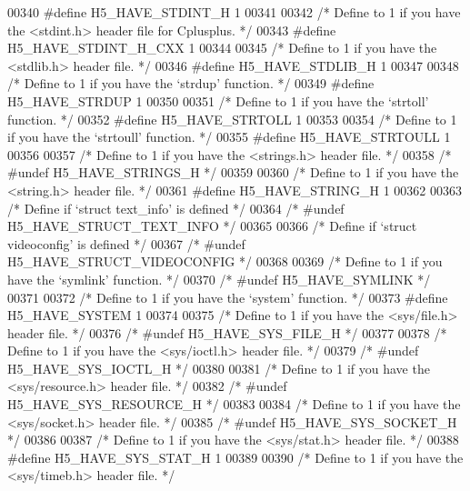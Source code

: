 \begin{DoxyCode}
{00340 \textcolor{preprocessor}{#define H5\_HAVE\_STDINT\_H 1}
00341 
00342 \textcolor{comment}{/* Define to 1 if you have the <stdint.h> header file for Cplusplus. */}
00343 \textcolor{preprocessor}{#define H5\_HAVE\_STDINT\_H\_CXX 1}
00344 
00345 \textcolor{comment}{/* Define to 1 if you have the <stdlib.h> header file. */}
00346 \textcolor{preprocessor}{#define H5\_HAVE\_STDLIB\_H 1}
00347 
00348 \textcolor{comment}{/* Define to 1 if you have the `strdup' function. */}
00349 \textcolor{preprocessor}{#define H5\_HAVE\_STRDUP 1}
00350 
00351 \textcolor{comment}{/* Define to 1 if you have the `strtoll' function. */}
00352 \textcolor{preprocessor}{#define H5\_HAVE\_STRTOLL 1}
00353 
00354 \textcolor{comment}{/* Define to 1 if you have the `strtoull' function. */}
00355 \textcolor{preprocessor}{#define H5\_HAVE\_STRTOULL 1}
00356 
00357 \textcolor{comment}{/* Define to 1 if you have the <strings.h> header file. */}
00358 \textcolor{comment}{/* #undef H5\_HAVE\_STRINGS\_H */}
00359 
00360 \textcolor{comment}{/* Define to 1 if you have the <string.h> header file. */}
00361 \textcolor{preprocessor}{#define H5\_HAVE\_STRING\_H 1}
00362 
00363 \textcolor{comment}{/* Define if `struct text\_info' is defined */}
00364 \textcolor{comment}{/* #undef H5\_HAVE\_STRUCT\_TEXT\_INFO */}
00365 
00366 \textcolor{comment}{/* Define if `struct videoconfig' is defined */}
00367 \textcolor{comment}{/* #undef H5\_HAVE\_STRUCT\_VIDEOCONFIG */}
00368 
00369 \textcolor{comment}{/* Define to 1 if you have the `symlink' function. */}
00370 \textcolor{comment}{/* #undef H5\_HAVE\_SYMLINK */}
00371 
00372 \textcolor{comment}{/* Define to 1 if you have the `system' function. */}
00373 \textcolor{preprocessor}{#define H5\_HAVE\_SYSTEM 1}
00374 
00375 \textcolor{comment}{/* Define to 1 if you have the <sys/file.h> header file. */}
00376 \textcolor{comment}{/* #undef H5\_HAVE\_SYS\_FILE\_H */}
00377 
00378 \textcolor{comment}{/* Define to 1 if you have the <sys/ioctl.h> header file. */}
00379 \textcolor{comment}{/* #undef H5\_HAVE\_SYS\_IOCTL\_H */}
00380 
00381 \textcolor{comment}{/* Define to 1 if you have the <sys/resource.h> header file. */}
00382 \textcolor{comment}{/* #undef H5\_HAVE\_SYS\_RESOURCE\_H */}
00383 
00384 \textcolor{comment}{/* Define to 1 if you have the <sys/socket.h> header file. */}
00385 \textcolor{comment}{/* #undef H5\_HAVE\_SYS\_SOCKET\_H */}
00386 
00387 \textcolor{comment}{/* Define to 1 if you have the <sys/stat.h> header file. */}
00388 \textcolor{preprocessor}{#define H5\_HAVE\_SYS\_STAT\_H 1}
00389 
00390 \textcolor{comment}{/* Define to 1 if you have the <sys/timeb.h> header file. */}
}
\end{DoxyCode}
